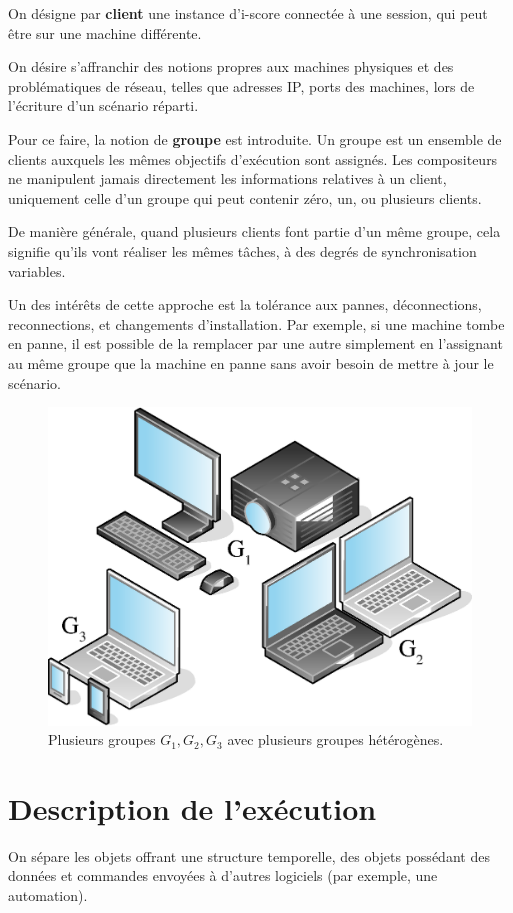 \documentclass[10pt]{article}
\newcommand\vocab[1]{\textbf{#1}}
\begin{document}
On désigne par \vocab{client} une instance d'i-score connectée à une session, qui peut être sur une machine différente.

On désire s'affranchir des notions propres aux machines physiques et des problématiques de réseau, telles que adresses IP, ports des machines, lors de l'écriture d'un scénario réparti. 

Pour ce faire, la notion de \vocab{groupe} est introduite. 
Un groupe est un ensemble de clients auxquels les mêmes objectifs d'exécution sont assignés.
Les compositeurs ne manipulent jamais directement les informations relatives à un client, uniquement celle d'un groupe qui peut contenir zéro, un, ou plusieurs clients.

De manière générale, quand plusieurs clients font partie d'un même groupe, cela signifie qu'ils vont réaliser les mêmes tâches, à des degrés de synchronisation variables.

Un des intérêts de cette approche est la tolérance aux pannes, déconnections, reconnections, et changements d'installation. 
Par exemple, si une machine tombe en panne, il est possible de la remplacer par une autre simplement en l'assignant au même groupe que la machine en panne 
sans avoir besoin de mettre à jour le scénario.


\begin{figure}[h]
	\centering
	\includegraphics[scale=0.4]{images/groupes.eps}
	\caption{Plusieurs groupes $G_1,G_2,G_3$ avec plusieurs groupes hétérogènes.}
	\label{img.groupes}
\end{figure}


\section{Description de l'exécution}\label{sec.description}
On sépare les objets offrant une structure temporelle, des objets possédant des données et commandes envoyées à d'autres logiciels (par exemple, une automation).
\end{document}
